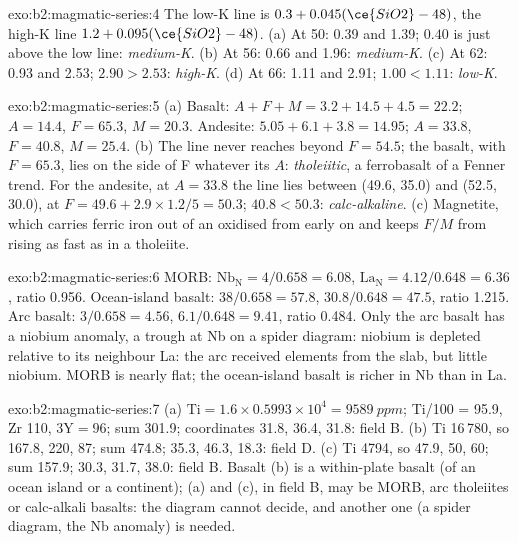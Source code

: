 \begin{solution}{exo:b2:magmatic-series:4}
The low-K line is $0.3 + 0.045(\ce{SiO2} - 48)$, the high-K line $1.2 +
0.095(\ce{SiO2} - 48)$. (a) At 50: 0.39 and 1.39; $0.40$ is just above the low line:
\emph{medium-K}. (b) At 56: 0.66 and 1.96: \emph{medium-K}. (c) At 62: 0.93 and 2.53;
$2.90 > 2.53$: \emph{high-K}. (d) At 66: 1.11 and 2.91; $1.00 < 1.11$: \emph{low-K}.
\end{solution}

\begin{solution}{exo:b2:magmatic-series:5}
(a) Basalt: $A + F + M = 3.2 + 14.5 + 4.5 = 22.2$; $A = 14.4$, $F = 65.3$, $M = 20.3$.
Andesite: $5.05 + 6.1 + 3.8 = 14.95$; $A = 33.8$, $F = 40.8$, $M = 25.4$. (b) The line
never reaches beyond $F = 54.5$; the basalt, with $F = 65.3$, lies on the side of F
whatever its $A$: \emph{tholeiitic}, a ferrobasalt of a Fenner trend. For the
andesite, at $A = 33.8$ the line lies between (49.6, 35.0) and (52.5, 30.0), at $F =
49.6 + 2.9\times1.2/5 = 50.3$; $40.8 < 50.3$: \emph{calc-alkaline}. (c) Magnetite,
which carries ferric iron out of an oxidised  from early on and keeps $F/M$ from
rising as fast as in a tholeiite.
\end{solution}

\begin{solution}{exo:b2:magmatic-series:6}
MORB: $\mathrm{Nb_N} = 4/0.658 = 6.08$, $\mathrm{La_N} = 4.12/0.648 = 6.36$, ratio
0.956. Ocean-island basalt: $38/0.658 = 57.8$, $30.8/0.648 = 47.5$, ratio 1.215. Arc
basalt: $3/0.658 = 4.56$, $6.1/0.648 = 9.41$, ratio 0.484. Only the arc basalt has a
niobium anomaly, a trough at Nb on a spider diagram: niobium is depleted relative to
its neighbour La: the arc  received elements from the slab, but little
niobium. MORB is nearly flat; the ocean-island basalt is richer
in Nb than in La.
\end{solution}

\begin{solution}{exo:b2:magmatic-series:7}
(a) $\mathrm{Ti} = 1.6\times0.5993\times10^4 = \qty{9589}{ppm}$; Ti/100 = 95.9, Zr
110, $3\mathrm Y = 96$; sum 301.9; coordinates 31.8, 36.4, 31.8: field B. (b) Ti
16\,780, so 167.8, 220, 87; sum 474.8; 35.3, 46.3, 18.3: field D. (c) Ti 4794, so
47.9, 50, 60; sum 157.9; 30.3, 31.7, 38.0: field B. Basalt (b) is a within-plate basalt
(of an ocean island or a continent); (a) and (c), in field B, may be MORB, arc
tholeiites or calc-alkali basalts: the diagram cannot decide, and another one (a
spider diagram, the Nb anomaly) is needed.
\end{solution}

